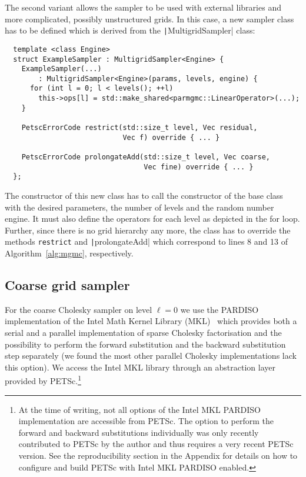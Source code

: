\documentclass[
fontsize=11pt,
paper=a4,
numbers=noenddot
]{scrartcl}
\begin{document}
The second variant allows the sampler to be used with external libraries and more complicated, possibly unstructured grids. In this case, a new sampler class has to be defined which is derived from the \texttt|MultigridSampler| class:
\begin{verbatim}
  template <class Engine> 
  struct ExampleSampler : MultigridSampler<Engine> {
    ExampleSampler(...)
        : MultigridSampler<Engine>(params, levels, engine) {
      for (int l = 0; l < levels(); ++l)
        this->ops[l] = std::make_shared<parmgmc::LinearOperator>(...);
    }

    PetscErrorCode restrict(std::size_t level, Vec residual, 
                            Vec f) override { ... }

    PetscErrorCode prolongateAdd(std::size_t level, Vec coarse,
                                 Vec fine) override { ... }
  };    
\end{verbatim}
The constructor of this new class has to call the constructor of the base class with the desired parameters, the number of levels and the random number engine. It must also define the operators for each level as depicted in the for loop. Further, since there is no grid hierarchy any more, the class has to override the methods \texttt{restrict} and \texttt|prolongateAdd| which correspond to lines 8 and 13 of Algorithm~\ref{alg:mgmc}, respectively.

\subsection{Coarse grid sampler}
For the coarse Cholesky sampler on level $\ell = 0$ we use the PARDISO implementation of the Intel Math Kernel Library (MKL)~\cite{intelmkl} which provides both a serial and a parallel implementation of sparse Cholesky factorisation and the possibility to perform the forward substitution and the backward substitution step separately (we found the most other parallel Cholesky implementations lack this option). We access the Intel MKL library through an abstraction layer provided by PETSc.\footnote{At the time of writing, not all options of the Intel MKL PARDISO implementation are accessible from PETSc. The option to perform the forward and backward substitutions individually was only recently contributed to PETSc by the author and thus requires a very recent PETSc version. See the reproducibility section in the Appendix for details on how to configure and build PETSc with Intel MKL PARDISO enabled.} 
\end{document}
